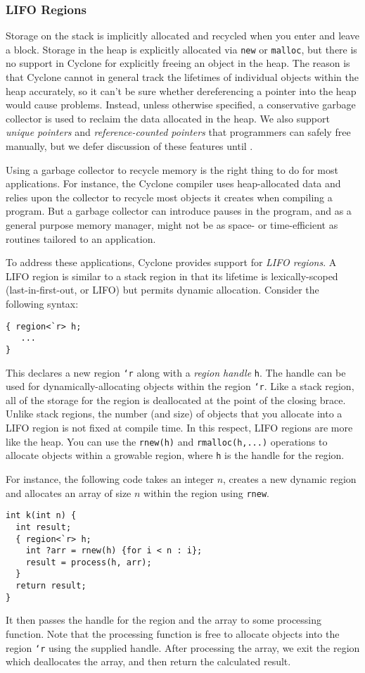\subsubsection*{LIFO Regions}

Storage on the stack is implicitly allocated and recycled when you
enter and leave a block.  Storage in the heap is explicitly allocated
via \texttt{new} or \texttt{malloc}, but there is no support in
Cyclone for explicitly freeing an object in the heap.  The reason is
that Cyclone cannot in general track the lifetimes of individual
objects within the heap accurately, so it can't be sure whether dereferencing a
pointer into the heap would cause problems.  Instead, unless otherwise
specified, a conservative
garbage collector is used to reclaim the data allocated in the heap.
We also support \emph{unique pointers} and \emph{reference-counted
  pointers} that programmers can safely free manually, but we defer
discussion of these features until
.

Using a garbage collector to recycle memory is the right thing to do
for most applications.  For instance, the Cyclone compiler uses
heap-allocated data and relies upon the collector to recycle most
objects it creates when compiling a program.  But a garbage collector
can introduce pauses in the program, and as a general purpose memory
manager, might not be as space- or time-efficient as routines tailored
to an application.

To address these applications, Cyclone provides support for \emph{LIFO
regions}.  A LIFO region is similar to a stack region in that its
lifetime is lexically-scoped (last-in-first-out, or LIFO) but permits
dynamic allocation.  Consider the following syntax:
\begin{verbatim}
{ region<`r> h;
   ...
}
\end{verbatim}
This declares a new region \texttt{`r} along with a \emph{region handle}
\texttt{h}.  The handle can be used for dynamically-allocating objects within
the region \texttt{`r}.  Like a stack region, all of the storage for
the region is deallocated at the point of the closing brace.  
Unlike stack
regions, the number (and size) of objects that you allocate into a LIFO
region is not fixed at compile time.  In this respect, LIFO
regions are more like the heap.  You can use the \texttt{rnew(h)} and
\texttt{rmalloc(h,...)} operations to allocate objects within a growable
region, where \texttt{h} is the handle for the region.
 
For instance, the following code takes an integer $n$, creates
a new dynamic region and allocates an array of size
$n$ within the region using \texttt{rnew}.  
\begin{verbatim}
int k(int n) {
  int result;
  { region<`r> h;
    int ?arr = rnew(h) {for i < n : i};
    result = process(h, arr);
  }
  return result;
}
\end{verbatim}
It then passes the
handle for the region and the array to some processing function.
Note that the processing function is free to allocate objects
into the region \texttt{`r} using the supplied handle.  
After processing the array, we exit the region which deallocates
the array, and then return the calculated result.

